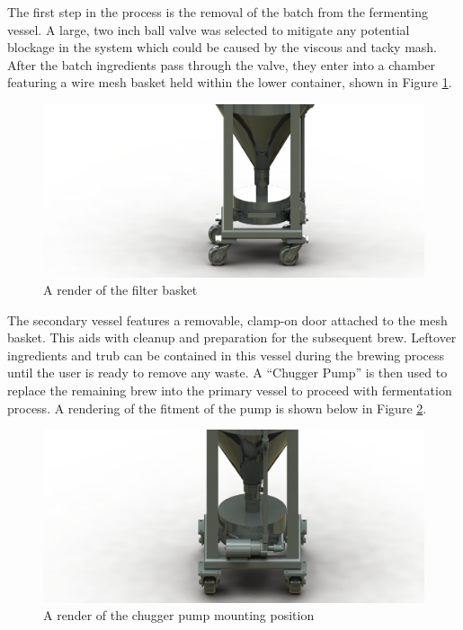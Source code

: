 \documentclass{article}
\begin{document}
The first step in the process is the removal of the batch from the fermenting vessel. A large, two inch ball valve was selected to mitigate any potential blockage in the system which could be caused by the viscous and tacky \gls{mash}.  After the batch ingredients pass through the valve, they enter into a chamber featuring a wire mesh basket held within the lower container, shown in Figure \ref{fig:filter-basket-render}.

\begin{figure}[H]
\begin{center}
\includegraphics[scale=1]{filter-basket-render.png}
\caption{A render of the filter basket}
\label{fig:filter-basket-render}
\end{center}
\end{figure}

The secondary vessel features a removable, clamp-on door attached to the mesh basket.  This aids with cleanup and preparation for the subsequent brew.  Leftover ingredients and \gls{trub} can be contained in this vessel during the brewing process until the user is ready to remove any waste. A ``Chugger Pump'' is then used to replace the remaining brew into the primary vessel to proceed with fermentation process.  A rendering of the fitment of the pump is shown below in Figure \ref{fig:chugger-pump}.

\begin{figure}[H]
\begin{center}
\includegraphics[scale=1]{chugger-pump.png}
\caption{A render of the chugger pump mounting position}
\label{fig:chugger-pump}
\end{center}
\end{figure}
\end{document}
